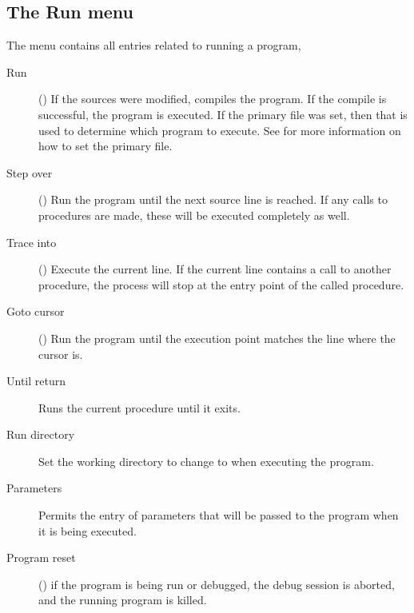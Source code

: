 \subsection{The Run menu}
\label{se:menurun}
The  menu contains all entries related to running a program,
\begin{description}
\item[Run] ()
If the sources were modified, compiles the program. If the compile is
successful, the program is executed. If the primary file  was set, then
that is used to determine which program to execute. See 
for more information on how to set the primary file.
\item[Step over] ()
Run the program until the next source line is reached. If any calls to
procedures are made, these will be executed completely as well.
\item[Trace into] ()
Execute the current line. If the current line contains a call to another
procedure, the process will stop at the entry point of the called procedure.
\item[Goto cursor] ()
Run the program until the execution point matches the line where the cursor
is.
\item[Until return] Runs the current procedure until it exits.
\item[Run directory] Set the working directory to change to when 
executing the program.
\item[Parameters]
Permits the entry of parameters that will be passed to the program when 
it is being executed.
\item[Program reset] () if the program is being run or
debugged, the debug session is aborted, and the running program is killed.
\end{description}
%
%

